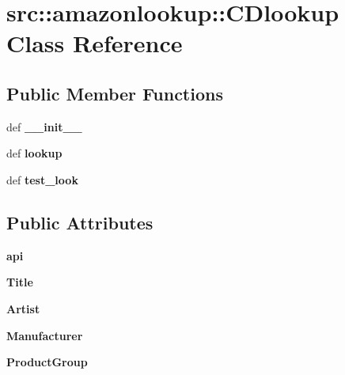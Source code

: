 \hypertarget{classsrc_1_1amazonlookup_1_1CDlookup}{
\section{src::amazonlookup::CDlookup Class Reference}
\label{classsrc_1_1amazonlookup_1_1CDlookup}
}
\subsection*{Public Member Functions}
\begin{DoxyCompactItemize}
\item 
\hypertarget{classsrc_1_1amazonlookup_1_1CDlookup_a11ddd958b3300ffe1abeadbc5d25dccb}{
def {\bfseries \_\-\_\-init\_\-\_\-}}
\label{classsrc_1_1amazonlookup_1_1CDlookup_a11ddd958b3300ffe1abeadbc5d25dccb}

\item 
\hypertarget{classsrc_1_1amazonlookup_1_1CDlookup_a765a81a723514b89fdbea535f94aba7d}{
def {\bfseries lookup}}
\label{classsrc_1_1amazonlookup_1_1CDlookup_a765a81a723514b89fdbea535f94aba7d}

\item 
\hypertarget{classsrc_1_1amazonlookup_1_1CDlookup_a82faf7df40f04d189de257244c93be0b}{
def {\bfseries test\_\-look}}
\label{classsrc_1_1amazonlookup_1_1CDlookup_a82faf7df40f04d189de257244c93be0b}

\end{DoxyCompactItemize}
\subsection*{Public Attributes}
\begin{DoxyCompactItemize}
\item 
\hypertarget{classsrc_1_1amazonlookup_1_1CDlookup_ae386ca1acf83072fb2366e7b8b200a16}{
{\bfseries api}}
\label{classsrc_1_1amazonlookup_1_1CDlookup_ae386ca1acf83072fb2366e7b8b200a16}

\item 
\hypertarget{classsrc_1_1amazonlookup_1_1CDlookup_aaeedd9b03a09e41660fea311c2a0360a}{
{\bfseries Title}}
\label{classsrc_1_1amazonlookup_1_1CDlookup_aaeedd9b03a09e41660fea311c2a0360a}

\item 
\hypertarget{classsrc_1_1amazonlookup_1_1CDlookup_ab8b198f1230c81256abcaca5e4e8a289}{
{\bfseries Artist}}
\label{classsrc_1_1amazonlookup_1_1CDlookup_ab8b198f1230c81256abcaca5e4e8a289}

\item 
\hypertarget{classsrc_1_1amazonlookup_1_1CDlookup_a691082d8bea006631560b5f39fdd1af8}{
{\bfseries Manufacturer}}
\label{classsrc_1_1amazonlookup_1_1CDlookup_a691082d8bea006631560b5f39fdd1af8}

\item 
\hypertarget{classsrc_1_1amazonlookup_1_1CDlookup_af03b9f1ffdbc175925f372854f1b338c}{
{\bfseries ProductGroup}}
\label{classsrc_1_1amazonlookup_1_1CDlookup_af03b9f1ffdbc175925f372854f1b338c}

\end{DoxyCompactItemize}


